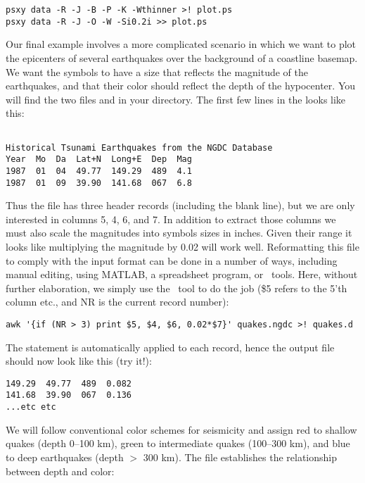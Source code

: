 \documentclass{report}
\begin{document}
\begin{verbatim} 
psxy data -R -J -B -P -K -Wthinner >! plot.ps
psxy data -R -J -O -W -Si0.2i >> plot.ps
\end{verbatim} 

Our final  example involves a more complicated scenario
in which we want to plot the epicenters of several earthquakes over
the background of a coastline basemap.  We want the symbols to have a
size that reflects the magnitude of the earthquakes, and that their
color should reflect the depth of the hypocenter.  You will find the
two files  and  in your
directory.  The first few lines in the  looks
like this:\par 

\begin{verbatim}

Historical Tsunami Earthquakes from the NGDC Database
Year  Mo  Da  Lat+N  Long+E  Dep  Mag
1987  01  04  49.77  149.29  489  4.1
1987  01  09  39.90  141.68  067  6.8
\end{verbatim}

Thus the file has three header records (including the blank line),
but we are only interested in columns 5, 4, 6, and 7.  In addition to
extract those columns we must also scale the magnitudes into symbols
sizes in inches.  Given their range it looks like multiplying the
magnitude by 0.02 will work well.  Reformatting this file to comply
with the  input format can be done in a number of ways,
including manual editing, using MATLAB, a spreadsheet program, or \UNIX\
tools.  Here, without further elaboration, we simply use the \UNIX\ tool
\progname{awk} to do the job (\$5 refers to the 5'th column etc., and NR
is the current record number):

\begin{verbatim}
awk '{if (NR > 3) print $5, $4, $6, 0.02*$7}' quakes.ngdc >! quakes.d
\end{verbatim} 

The  statement is automatically applied to each record,
hence the output file \filename{quakes.d} should now look like this (try it!):

\begin{verbatim}
149.29  49.77  489  0.082
141.68  39.90  067  0.136
...etc etc
\end{verbatim} 

We will follow conventional color schemes for seismicity and assign red
to shallow quakes (depth 0--100 km), green to intermediate quakes
(100--300 km), and blue to deep earthquakes (depth $>$ 300 km).  The
\filename{quakes.cpt} file establishes the relationship between depth
and color:
\end{document}
